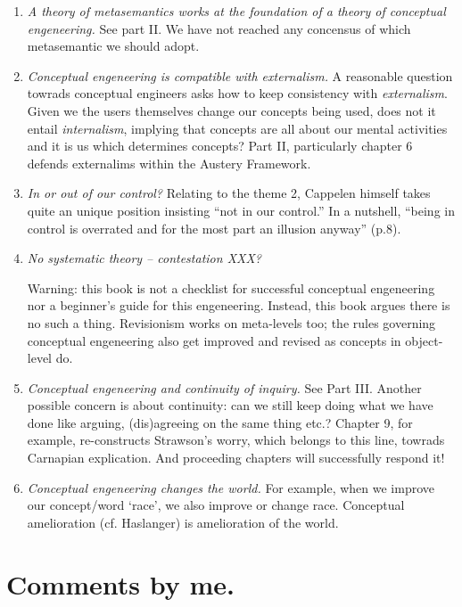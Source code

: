 \documentclass[
10pt, %
a4paper, %
twocolumn, %
landscape %
]{article}
\begin{document}
\begin{enumerate}
  \item \emph{A theory of metasemantics works at the foundation of a theory of conceptual engeneering.}
See part II. We have not reached any concensus of which metasemantic we should adopt.

  \item \emph{Conceptual engeneering is compatible with externalism.}
  A reasonable question towrads conceptual engineers asks how to keep consistency with \emph{externalism}.
  Given we the users themselves change our concepts being used, does not it entail \emph{internalism}, implying that concepts are all about our mental activities and it is us which determines concepts?
Part II, particularly chapter 6 defends externalims within the Austery Framework.

  \item \emph{In or out of our control?}
  Relating to the theme 2, Cappelen himself takes quite an unique position insisting ``not in our control.''
In a nutshell, ``being in control is overrated and for the most part an illusion anyway'' (p.8).

  \item \emph{No systematic theory -- contestation XXX?}

  Warning: this book is not a checklist for successful conceptual engeneering nor a beginner's guide for this engeneering. Instead, this book argues there is no such a thing.
Revisionism works on meta-levels too; the rules governing conceptual engeneering also get improved and revised as concepts in object-level do.

  \item \emph{Conceptual engeneering and continuity of inquiry.}
  See Part III.
Another possible concern is about continuity: can we still keep doing what we have done like arguing, (dis)agreeing on the same thing etc.?
Chapter 9, for example, re-constructs Strawson's worry, which belongs to this line, towrads Carnapian explication. And proceeding chapters will successfully respond it!

  \item \emph{Conceptual engeneering changes the world.}
  For example, when we improve our concept/word `race', we also improve or change race.
Conceptual amelioration (cf. Haslanger) is amelioration of the world.

\end{enumerate}

\section*{Comments by me.}

\renewcommand{\refname}{Reference} %


\end{document}
